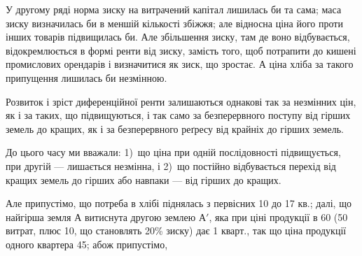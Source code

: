 У другому ряді норма зиску на витрачений капітал лишилась би та
сама; маса зиску визначилась би в меншій кількості збіжжя; але відносна ціна
його проти інших товарів підвищилась би. Але збільшення зиску, там де воно
відбувається, відокремлюється в формі ренти від зиску, замість того, щоб потрапити
до кишені промислових орендарів і визначитися як зиск, що зростає.
А ціна хліба за такого припущення лишилась би незмінною.

Розвиток і зріст диференційної ренти залишаються однакові так за незмінних
цін, як і за таких, що підвищуються, і так само за безперервного поступу
від гірших земель до кращих, як і за безперервного реґресу від крайніх
до гірших земель.

До цього часу ми вважали: 1)~що ціна при одній послідовності підвищується,
при другій — лишається незмінна, і 2)~що постійно відбувається перехід
від кращих земель до гірших або навпаки — від гірших до кращих.

Але припустімо, що потреба в хлібі піднялась з первісних 10 до 17 кв.;
далі, що найгірша земля $А$ витиснута другою землею $А'$, яка при ціні продукції
в 60 (50 витрат, плюс 10, що становлять 20\% зиску) дає
1 кварт., так що ціна продукції одного квартера \deq{} 45; абож припустімо,
\parbreak{}  %
